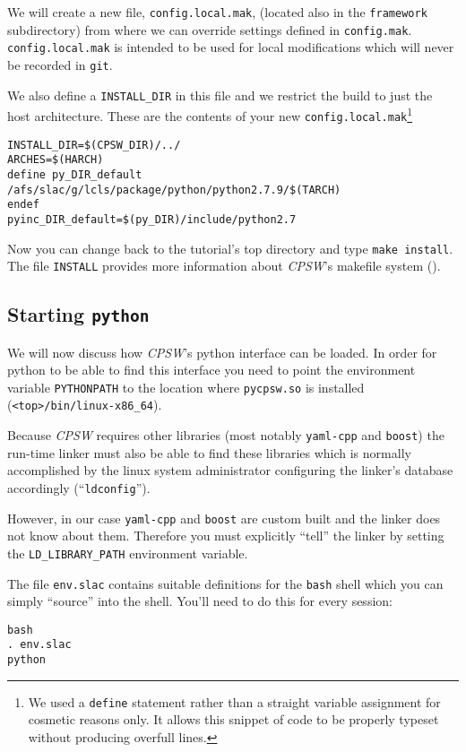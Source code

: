 \documentclass[10pt]{article}
\newcommand{\ita}[1]{\emph{#1}}
\newcommand{\cpsw}      {\ita {CPSW}}
\newcommand{\py}        {python}
\newcommand{\cod}[1] {{\tt#1}}
\begin{document}
We will create a new file, \cod{config.local.mak}, (located also in the \cod{framework}
subdirectory) from where we can override settings defined in \cod{config.mak}.
\cod{config.local.mak} is intended to be used for local modifications which will
never be recorded in \cod{git}.

We also define a \cod{INSTALL\_DIR} in this file and we restrict the build to
just the host architecture. These are the contents of your new
\cod{config.local.mak}\footnote{We used a \cod{define} statement rather
than a straight variable assignment for cosmetic reasons only. It allows this
snippet of code to be properly typeset without producing overfull lines.}
\begin{verbatim}
INSTALL_DIR=$(CPSW_DIR)/../
ARCHES=$(HARCH)
define py_DIR_default
/afs/slac/g/lcls/package/python/python2.7.9/$(TARCH)
endef
pyinc_DIR_default=$(py_DIR)/include/python2.7
\end{verbatim}

Now you can change back to the tutorial's top directory and type \cod{make install}.
The file \cod{INSTALL} provides more information about \cpsw{}'s
makefile system (\cite{INSTALL, makefile}).

\subsection{Starting \cod{\py}}
We will now discuss how \cpsw{}'s \py{} interface can be loaded. In order for
\py{} to be able to find this interface you need to point the environment variable
\cod{PYTHONPATH} to the location where \cod{pycpsw.so} is installed
(\cod{<top>/bin/linux-x86\_64}).

Because \cpsw{} requires other libraries (most notably \cod{yaml-cpp} and \cod{boost})
the run-time linker must also be able to find these libraries which is normally
accomplished by the linux system administrator configuring the linker's database
accordingly (``\cod{ldconfig}'').

However, in our case \cod{yaml-cpp} and \cod{boost} are custom built and the linker
does not know about them. Therefore you must explicitly ``tell'' the linker by setting
the \cod{LD\_LIBRARY\_PATH} environment variable.

The file \cod{env.slac} contains suitable definitions for the \cod{bash} shell which
you can simply ``source'' into the shell. You'll need to do this for every session:

\begin{verbatim}
bash
. env.slac
python
\end{verbatim}
\end{document}
